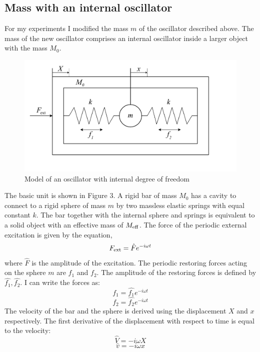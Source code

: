 \documentclass[12pt]{article}
\begin{document}
\subsection{Mass with an internal oscillator}
For my experiments I modified the mass $m$ of the oscillator described above. The mass of the new oscillator comprises an internal oscillator inside a larger object with the mass $M_{0}$.
\begin{figure}[hbt]
  \includegraphics[width=0.7\columnwidth]{oscillator_with_internal_degree_of_freedom.pdf}
  \caption{Model of an oscillator with internal degree of freedom}
\end{figure}
The basic unit is shown in Figure 3. A rigid bar of mass $M_0$ has a cavity to connect to a rigid sphere of mass $m$ by two massless elastic springs with equal constant $k$. The bar together with the internal sphere and springs is equivalent to a solid object with an effective mass of $M_{\rm eff}$. The force of the periodic external excitation is given by the equation, 
\begin{equation}\label{eq:8}
	F_{\rm ext} = \hat{F} e^{-i\omega t}
\end{equation}
where $\hat{F}$ is the amplitude of the excitation. The periodic restoring forces acting on the sphere $m$ are $f_1$ and $f_2$. The amplitude of the restoring forces is defined by $\hat{f_1},\hat{f_2}$. I can write the forces as:
\begin{equation}\label{eq:9}
	f_1 = \hat{f_1} e^{-i\omega t}	
\end{equation}
\begin{equation}\label{eq:10}
	f_2 = \hat{f_2} e^{-i\omega t}	
\end{equation}
The velocity of the bar and the sphere is derived using the displacement $X$ and $x$ respectively. The first derivative of the displacement with respect to time is equal to the velocity: 
\begin{equation}\label{eq:11}
	\hat{V} = -i\omega X	
\end{equation}
\begin{equation}\label{eq:12}
	\hat{v} = -i\omega x
\end{equation}
\end{document}
